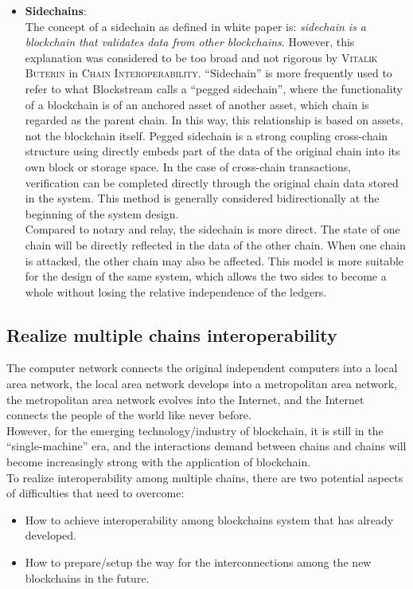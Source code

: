 \begin{itemize}
    \item \textbf{Sidechains}:\\
     The concept of a sidechain as defined in white paper\cite{back2014enabling} is: \textit{sidechain is a blockchain that validates data from other blockchains}. However, this explanation was considered to be too broad and not rigorous by \textsc{Vitalik Buterin} in \textsc{Chain Interoperability}\cite{buterin2016chain}. ``Sidechain'' is more frequently used to refer to what Blockstream calls a ``pegged sidechain'', where the functionality of a blockchain is of an anchored asset of another asset, which chain is regarded as the parent chain. In this way, this relationship is based on assets, not the blockchain itself. Pegged sidechain is a strong coupling cross-chain structure using directly embeds part of the data of the original chain into its own block or storage space. In the case of cross-chain transactions,  verification can be completed directly through the original chain data stored in the system. This method is generally considered bidirectionally at the beginning of the system design.\\
     Compared to notary and relay, the sidechain is more direct. The state of one chain will be directly reflected in the data of the other chain. When one chain is attacked, the other chain may also be affected. This model is more suitable for the design of the same system, which allows the two sides to become a whole without losing the relative independence of the ledgers.

\end{itemize}
\subsection{Realize multiple chains interoperability}
\noindent The computer network connects the original independent computers into a local area network, the local area network develops into a metropolitan area network, the metropolitan area network evolves into the Internet, and the Internet connects the people of the world like never before.\\
\noindent However, for the emerging technology/industry of blockchain, it is still in the ``single-machine'' era, and the interactions demand between chains and chains will become increasingly strong with the application of blockchain.\\
\noindent To realize interoperability among multiple chains, there are two potential aspects of difficulties that need to overcome: 
\begin{itemize}
    \item How to achieve interoperability among blockchains system that has already developed.
    \item How to prepare/setup the way for the interconnections among the new blockchains in the future.
\end{itemize}

